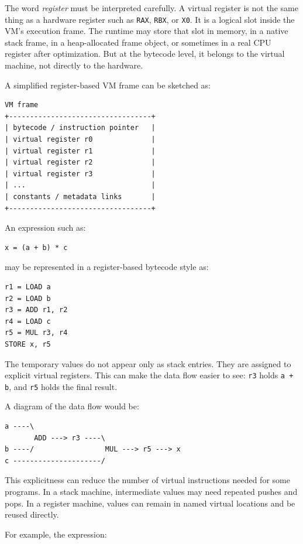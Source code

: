 The word \emph{register} must be interpreted carefully. A virtual register is not the same thing as a hardware register such as \texttt{RAX}, \texttt{RBX}, or \texttt{X0}. It is a logical slot inside the VM's execution frame. The runtime may store that slot in memory, in a native stack frame, in a heap-allocated frame object, or sometimes in a real CPU register after optimization. But at the bytecode level, it belongs to the virtual machine, not directly to the hardware.

A simplified register-based VM frame can be sketched as:

\begin{verbatim}
VM frame
+----------------------------------+
| bytecode / instruction pointer   |
| virtual register r0              |
| virtual register r1              |
| virtual register r2              |
| virtual register r3              |
| ...                              |
| constants / metadata links       |
+----------------------------------+
\end{verbatim}

An expression such as:

\begin{verbatim}
x = (a + b) * c
\end{verbatim}

may be represented in a register-based bytecode style as:

\begin{verbatim}
r1 = LOAD a
r2 = LOAD b
r3 = ADD r1, r2
r4 = LOAD c
r5 = MUL r3, r4
STORE x, r5
\end{verbatim}

The temporary values do not appear only as stack entries. They are assigned to explicit virtual registers. This can make the data flow easier to see: \texttt{r3} holds \texttt{a + b}, and \texttt{r5} holds the final result.

A diagram of the data flow would be:

\begin{verbatim}
a ----\
       ADD ---> r3 ----\
b ----/                 MUL ---> r5 ---> x
c ---------------------/
\end{verbatim}

This explicitness can reduce the number of virtual instructions needed for some programs. In a stack machine, intermediate values may need repeated pushes and pops. In a register machine, values can remain in named virtual locations and be reused directly.

For example, the expression:

